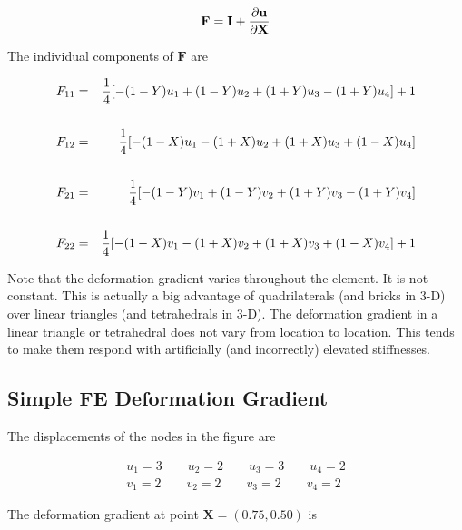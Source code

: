 \begin{equation*}
\mathbf{ F} = \mathbf{ I} + {\partial \mathbf{ u} \over \partial \mathbf{ X}}
\end{equation*}

The individual components of $ \mathbf{ F} $ are

\begin{eqnarray*}
F_{11} & = & {1 \over 4} [-(1-Y)u_1 + (1-Y)u_2 + (1+Y)u_3 - (1+Y)u_4] + 1 \\
\\
F_{12} & = & {1 \over 4} [-(1-X)u_1 - (1+X)u_2 + (1+X)u_3 + (1-X)u_4] \\
\\
F_{21} & = & {1 \over 4} [-(1-Y)v_1 + (1-Y)v_2 + (1+Y)v_3 - (1+Y)v_4] \\
\\
F_{22} & = & {1 \over 4} [-(1-X)v_1 - (1+X)v_2 + (1+X)v_3 + (1-X)v_4] + 1 \\
\end{eqnarray*}

Note that the deformation gradient varies throughout the element. It is not constant. This is actually a big advantage of quadrilaterals (and bricks in 3-D) over linear triangles (and tetrahedrals in 3-D). The deformation gradient in a linear triangle or tetrahedral does not vary from location to location. This tends to make them respond with artificially (and incorrectly) elevated stiffnesses.

\subsection{Simple FE Deformation Gradient}
The displacements of the nodes in the figure are

\begin{eqnarray*}
u_1 = 3 \qquad u_2 = 2 \qquad u_3 = 3 \qquad u_4 = 2 \\
v_1 = 2 \qquad v_2 = 2 \qquad v_3 = 2 \qquad v_4 = 2
\end{eqnarray*}

The deformation gradient at point $ \mathbf{ X} = (0.75,0.50) $ is

